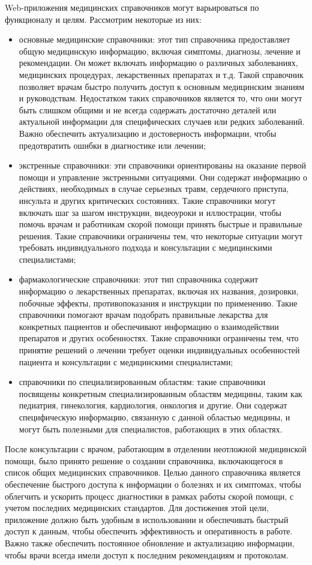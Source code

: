 Web-приложения медицинских справочников могут варьироваться по функционалу и целям. Рассмотрим некоторые из них:
\begin{itemize}
    \item основные медицинские справочники: этот тип справочника предоставляет общую медицинскую информацию, включая симптомы, диагнозы, лечение и рекомендации. Он может включать информацию о различных заболеваниях, медицинских процедурах, лекарственных препаратах и т.д. Такой справочник позволяет врачам быстро получить доступ к основным медицинским знаниям и руководствам. Недостатком таких справочников является то, что они могут быть слишком общими и не всегда содержать достаточно деталей или актуальной информации для специфических случаев или редких заболеваний. Важно обеспечить актуализацию и достоверность информации, чтобы предотвратить ошибки в диагностике или лечении;
    \item экстренные справочники: эти справочники ориентированы на оказание первой помощи и управление экстренными ситуациями. Они содержат информацию о действиях, необходимых в случае серьезных травм, сердечного приступа, инсульта и других критических состояниях. Такие справочники могут включать шаг за шагом инструкции, видеоуроки и иллюстрации, чтобы помочь врачам и работникам скорой помощи принять быстрые и правильные решения. Такие справочники ограничены тем, что некоторые ситуации могут требовать индивидуального подхода и консультации с медицинскими специалистами;
    \item фармакологические справочники: этот тип справочника содержит информацию о лекарственных препаратах, включая их названия, дозировки, побочные эффекты, противопоказания и инструкции по применению. Такие справочники помогают врачам подобрать правильные лекарства для конкретных пациентов и обеспечивают информацию о взаимодействии препаратов и других особенностях. Такие справочники ограничены тем, что принятие решений о лечении требует оценки индивидуальных особенностей пациента и консультации с медицинскими специалистами;
    \item справочники по специализированным областям: такие справочники посвящены конкретным специализированным областям медицины, таким как педиатрия, гинекология, кардиология, онкология и другие. Они содержат специфическую информацию, связанную с данной областью медицины, и могут быть полезными для специалистов, работающих в этих областях.
\end{itemize}

После консультации с врачом, работающим в отделении неотложной медицинской помощи, было принято решение о создании справочника, включающегося в список общих медицинских справочников. Целью данного справочника является обеспечение быстрого доступа к информации о болезнях и их симптомах, чтобы облегчить и ускорить процесс диагностики в рамках работы скорой помощи, с учетом последних медицинских стандартов. Для достижения этой цели, приложение должно быть удобным в использовании и обеспечивать быстрый доступ к данным, чтобы обеспечить эффективность и оперативность в работе. Важно также обеспечить постоянное обновление и актуализацию информации, чтобы врачи всегда имели доступ к последним рекомендациям и протоколам.

